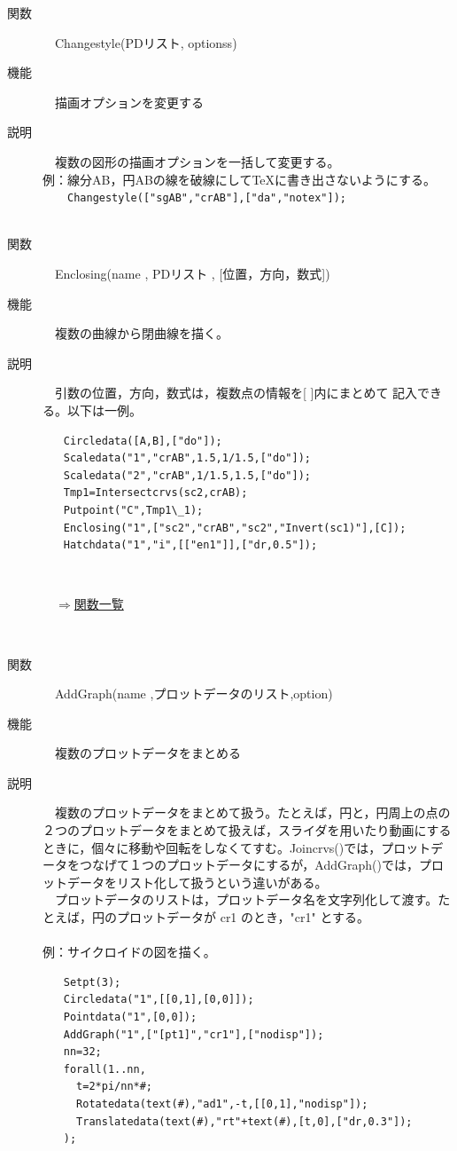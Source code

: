 \documentclass[papersize,a4paper,12pt,uplatex]{jsarticle}
\begin{document}
\begin{description}

\hypertarget{changestyple}{}
\item[関数]　Changestyle(PDリスト, optionss)
\item[機能]　描画オプションを変更する
\item[説明]　複数の図形の描画オプションを一括して変更する。\\

例：線分AB，円ABの線を破線にして\TeX に書き出さないようにする。\\
　　\verb|Changestyle(["sgAB","crAB"],["da","notex"]);|\\
　\\

\hypertarget{enclosing}{}
\item[関数]　Enclosing(name , PDリスト , [位置，方向，数式])
\item[機能]　複数の曲線から閉曲線を描く。
\item[説明]　引数の位置，方向，数式は，複数点の情報を[ ]内にまとめて
記入できる。以下は一例。
\begin{verbatim}
　　Circledata([A,B],["do"]);
　　Scaledata("1","crAB",1.5,1/1.5,["do"]);
　　Scaledata("2","crAB",1/1.5,1.5,["do"]);
　　Tmp1=Intersectcrvs(sc2,crAB);
　　Putpoint("C",Tmp1\_1);
　　Enclosing("1",["sc2","crAB","sc2","Invert(sc1)"],[C]);
　　Hatchdata("1","i",[["en1"]],["dr,0.5"]);
\end{verbatim}
　　　　　　　　　

\begin{flushright}　\hyperlink{functionlist}{$\Rightarrow$関数一覧}\end{flushright}
　\\

\hypertarget{addgraph}{}
\item[関数]　AddGraph(name ,プロットデータのリスト,option)
\item[機能]　複数のプロットデータをまとめる
\item[説明]　複数のプロットデータをまとめて扱う。たとえば，円と，円周上の点の２つのプロットデータをまとめて扱えば，スライダを用いたり動画にするときに，個々に移動や回転をしなくてすむ。Joincrvs()では，プロットデータをつなげて１つのプロットデータにするが，AddGraph()では，プロットデータをリスト化して扱うという違いがある。\\
　プロットデータのリストは，プロットデータ名を文字列化して渡す。たとえば，円のプロットデータが cr1 のとき，"cr1" とする。\\
　\\
例：サイクロイドの図を描く。
\begin{verbatim}
　　Setpt(3);
　　Circledata("1",[[0,1],[0,0]]);
　　Pointdata("1",[0,0]);
　　AddGraph("1",["[pt1]","cr1"],["nodisp"]);
　　nn=32;
　　forall(1..nn,
  　　t=2*pi/nn*#;
  　　Rotatedata(text(#),"ad1",-t,[[0,1],"nodisp"]);
  　　Translatedata(text(#),"rt"+text(#),[t,0],["dr,0.3"]);
　　);
\end{verbatim}


\end{description}
\end{document}

